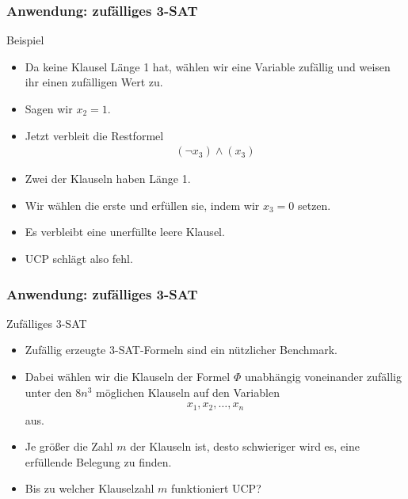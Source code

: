\documentclass{beamer}
\newcommand\bc[1]{\left({#1}\right)}
\newcommand{\mytitle}{Anwendung: zuf\"alliges 3-SAT}
\begin{document}
\begin{frame}\frametitle{\mytitle}
	\begin{block}{Beispiel}
		\begin{itemize}
			\item Da keine Klausel L\"ange 1 hat, w\"ahlen wir eine Variable zuf\"allig und weisen ihr einen zuf\"alligen Wert zu.
			\item Sagen wir $x_2=1$.
			\item Jetzt verbleit die Restformel
				\begin{align*}
					\bc{\neg x_3}\wedge\bc{x_3}
				\end{align*}
			\item Zwei der Klauseln haben L\"ange 1.
			\item Wir w\"ahlen die erste und erf\"ullen sie, indem wir $x_3=0$ setzen.
			\item Es verbleibt eine unerf\"ullte \alert{leere Klausel}.
			\item UCP schl\"agt also fehl.
		\end{itemize}
	\end{block}
\end{frame}

\begin{frame}\frametitle{\mytitle}
	\begin{block}{Zuf\"alliges 3-SAT}
		\begin{itemize}
			\item Zuf\"allig erzeugte 3-SAT-Formeln sind ein n\"utzlicher Benchmark.
			\item Dabei w\"ahlen wir die Klauseln der Formel $\Phi$ unabh\"angig voneinander zuf\"allig unter den $8n^3$ m\"oglichen Klauseln auf den Variablen
				\begin{align*}
				x_1,x_2,\ldots,x_n
				\end{align*}
				aus.
			\item Je gr\"o\ss er die Zahl $m$ der Klauseln ist, desto schwieriger wird es, eine erf\"ullende Belegung zu finden.
			\item \alert{Bis zu welcher Klauselzahl $m$ funktioniert UCP?}
		\end{itemize}
	\end{block}
\end{frame}
\end{document}
